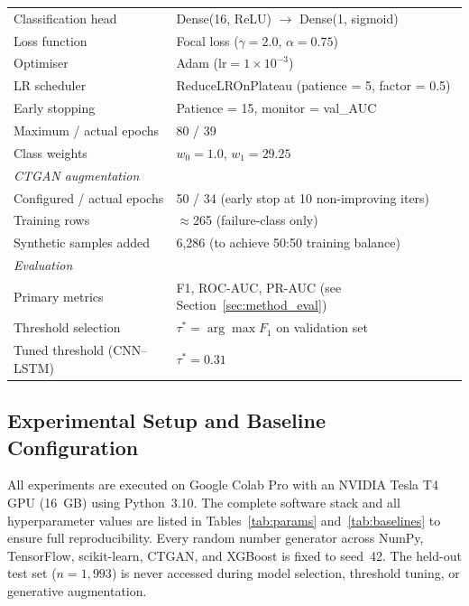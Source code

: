 \documentclass[sensors,article,submit,pdftex,moreauthors]{Definitions/mdpi}
\begin{document}
\begin{table}[H]
\begin{tabularx}{\textwidth}{lX}
Classification head        & Dense(16, ReLU) $\to$ Dense(1, sigmoid) \\
Loss function              & Focal loss ($\gamma = 2.0$, $\alpha = 0.75$) \\
Optimiser                  & Adam ($\text{lr} = 1\times10^{-3}$) \\
LR scheduler               & ReduceLROnPlateau (patience = 5, factor = 0.5) \\
Early stopping             & Patience = 15, monitor = val\_AUC \\
Maximum / actual epochs    & 80 / 39 \\
Class weights              & $w_0 = 1.0$, $w_1 = 29.25$ \\
\midrule
\multicolumn{2}{l}{\textit{CTGAN augmentation}} \\
Configured / actual epochs & 50 / 34 (early stop at 10 non-improving iters) \\
Training rows              & $\approx$265 (failure-class only) \\
Synthetic samples added    & 6{,}286 (to achieve 50:50 training balance) \\
\midrule
\multicolumn{2}{l}{\textit{Evaluation}} \\
Primary metrics            & F1, ROC-AUC, PR-AUC (see Section~\ref{sec:method_eval}) \\
Threshold selection        & $\tau^* = \arg\max F_1$ on validation set \\
Tuned threshold (CNN--LSTM) & $\tau^* = 0.31$ \\
\bottomrule
\end{tabularx}
\end{table}

\subsection{Experimental Setup and Baseline Configuration}
\label{sec:method_setup}

All experiments are executed on Google Colab Pro with an NVIDIA Tesla T4 GPU (16~GB) using Python~3.10.
The complete software stack and all hyperparameter values are listed in Tables~\ref{tab:params} and~\ref{tab:baselines} to ensure full reproducibility.
Every random number generator across NumPy, TensorFlow, scikit-learn, CTGAN, and XGBoost is fixed to seed~42.
The held-out test set ($n = 1{,}993$) is never accessed during model selection, threshold tuning, or generative augmentation.
\end{document}
